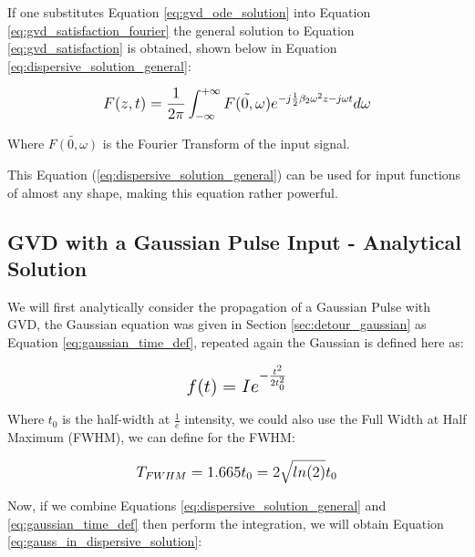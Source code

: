 \documentclass[colorlinks,11pt,a4paper,normalphoto,withhyper,ragged2e]{altareport}
\begin{document}
	\vspace{5mm}

If one substitutes Equation \ref{eq:gvd_ode_solution} into Equation \ref{eq:gvd_satisfaction_fourier} the general solution to Equation \ref{eq:gvd_satisfaction} is obtained, shown below in Equation \ref{eq:dispersive_solution_general}:

	\begin{equation} \label{eq:dispersive_solution_general}
		\mathlarger{F(z, t) = \frac{1}{2 \pi} \int_{-\infty}^{+\infty} \tilde{F(0, \omega)} e^{-j \frac{1}{2} \beta_2 \omega^2 z - j \omega t} d \omega}
	\end{equation}

	{\footnotesize Where $\tilde{F(0, \omega)}$ is the Fourier Transform of the input signal.} \linebreak	

	\vspace{5mm}
	
	This Equation (\ref{eq:dispersive_solution_general}) can be used for input functions of almost any shape, making this equation rather powerful. \linebreak
	
	
	\subsection{GVD with a Gaussian Pulse Input - Analytical Solution}
	
	We will first analytically consider the propagation of a Gaussian Pulse with GVD, the Gaussian equation was given in Section \ref{sec:detour_gaussian} as Equation \ref{eq:gaussian_time_def}, repeated again the Gaussian is defined here as:
	
	\begin{equation*}
		\mathlarger{ \mathlarger{ f(t) = I e^{-\frac{t^2}{2t^2_0}} } }
	\end{equation*}
	
	Where $t_0$ is the half-width at $\frac{1}{e}$ intensity, we could also use the Full Width at Half Maximum (FWHM), we can define for the FWHM:
	
	\begin{gather*}
		\mathlarger{ T_{FWHM} = 1.665 t_0 = 2 \sqrt{ln(2)} t_0 }
	\end{gather*}
	
	\vspace{5mm}
	
	Now, if we combine Equations \ref{eq:dispersive_solution_general} and \ref{eq:gaussian_time_def} then perform the integration, we will obtain Equation \ref{eq:gauss_in_dispersive_solution}:
	
\end{document}

